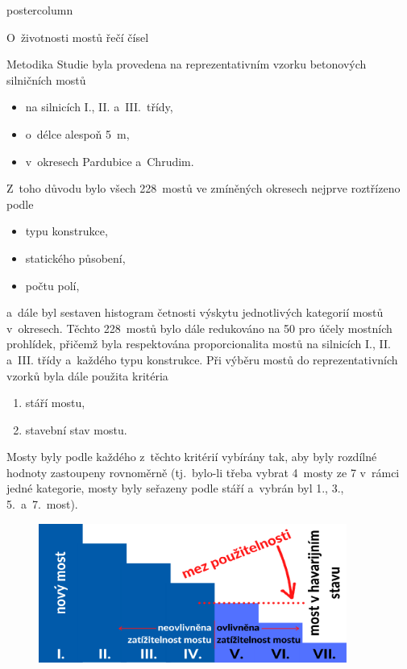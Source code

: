 \documentclass{beamer}
\begin{document}
\begin{frame}
\begin{columns}
\begin{column}{.4\textwidth}
\begin{beamercolorbox}[center]{postercolumn}
\begin{minipage}{.98\textwidth}
{\begin{myblock}{O~životnosti mostů řečí čísel}
\begin{figure}
							\label{fig:poster3}
						\end{figure}
					\end{myblock}\vfill
					\begin{myblock}{Metodika}
						Studie byla provedena na reprezentativním vzorku betonových silničních mostů
						\vskip 0.2cm
						\begin{itemize}
							\item na silnicích I., II. a~III.~třídy,
							\item o~délce alespoň 5~m,
							\item v~okresech Pardubice a~Chrudim.
						\end{itemize}
						\vskip 0.5cm
						Z~toho důvodu bylo všech 228~mostů ve zmíněných okresech nejprve roztřízeno podle
						\vskip 0.2cm
						\begin{itemize}
							\item typu konstrukce,
							\item statického působení,
							\item počtu polí,
						\end{itemize}
						\vskip 0.2cm
						a~dále byl sestaven histogram četnosti výskytu jednotlivých kategorií mostů v~okresech. Těchto 228~mostů bylo dále redukováno na 50 pro účely mostních prohlídek, přičemž byla respektována proporcionalita mostů na silnicích I., II. a~III. třídy a~každého typu konstrukce. 
						\vskip 0.5cm
						Při výběru mostů do reprezentativních vzorků byla dále použita kritéria
						\vskip 0.2cm
						\begin{enumerate}
							\item stáří mostu,
							\item stavební stav mostu.
						\end{enumerate}
						\vskip 0.4cm
						Mosty byly podle každého z~těchto kritérií vybírány tak, aby byly rozdílné hodnoty zastoupeny rovnoměrně (tj.~bylo-li třeba vybrat 4~mosty ze 7 v~rámci jedné kategorie, mosty byly seřazeny podle stáří a~vybrán byl 1., 3., 5.~a~7.~most).
						\begin{figure}
							\centering\includegraphics[width=0.9\textwidth]{img/stupne}

\end{figure}
\end{myblock}}
\end{minipage}
\end{beamercolorbox}
\end{column}
\end{columns}
\end{frame}
\end{document}
